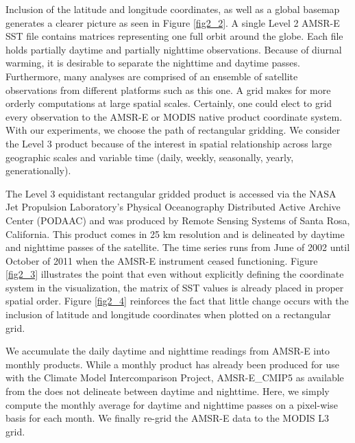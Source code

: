 \begin{refsection}
Inclusion of the latitude and longitude coordinates, as well as a global basemap generates a clearer picture as seen in Figure \ref{fig2_2}. A single Level 2 AMSR-E SST file contains matrices representing one full orbit around the globe. Each file holds partially daytime and partially nighttime observations. Because of diurnal warming, it is desirable to separate the nighttime and daytime passes. Furthermore, many analyses are comprised of an ensemble of satellite observations from different platforms such as this one. A grid makes for more orderly computations at large spatial scales. Certainly, one could elect to grid every observation to the AMSR-E or MODIS native product coordinate system. With our experiments, we choose the path of rectangular gridding. We consider the Level 3 product because of the interest in spatial relationship across large geographic scales and variable time (daily, weekly, seasonally, yearly, generationally). 

The Level 3 equidistant rectangular gridded product is accessed via the NASA Jet Propulsion Laboratory’s Physical Oceanography Distributed Active Archive Center (PODAAC) and was produced by Remote Sensing Systems of Santa Rosa, California. This product comes in 25 km resolution and is delineated by daytime and nighttime passes of the satellite. The time series runs from June of 2002 until October of 2011 when the AMSR-E instrument ceased functioning. Figure \ref{fig2_3} illustrates the point that even without explicitly defining the coordinate system in the visualization, the matrix of SST values is already placed in proper spatial order. Figure \ref{fig2_4} reinforces the fact that little change occurs with the inclusion of latitude and longitude coordinates when plotted on a rectangular grid.

We accumulate the daily daytime and nighttime readings from AMSR-E into monthly products. While a monthly product has already been produced for use with the Climate Model Intercomparison Project, AMSR-E\_CMIP5 as available from the does not delineate between daytime and nighttime. Here, we simply compute the monthly average for daytime and nighttime passes on a pixel-wise basis for each month. We finally re-grid the AMSR-E data to the MODIS L3 grid. 


\end{refsection}
